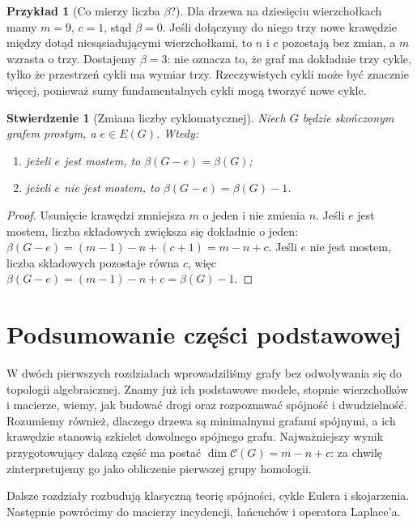 \documentclass[11pt,a4paper]{report}
\numberwithin{equation}{section}
\theoremstyle{plain}
\newtheorem{stwierdzenie}[twierdzenie]{Stwierdzenie}
\theoremstyle{definition}
\newtheorem{przyklad}[twierdzenie]{Przykład}
\theoremstyle{remark}
\begin{document}
\begin{przyklad}[Co mierzy liczba $\beta$?]
Dla drzewa na dziesięciu wierzchołkach mamy
$m=9$, $c=1$, stąd $\beta=0$.
Jeśli dołączymy do niego trzy nowe krawędzie
między dotąd niesąsiadującymi wierzchołkami,
to $n$ i $c$ pozostają bez zmian, a $m$
wzrasta o trzy. Dostajemy $\beta=3$:
nie oznacza to, że graf ma dokładnie trzy
cykle, tylko że przestrzeń cykli ma
wymiar trzy. Rzeczywistych cykli może
być znacznie więcej, ponieważ sumy
fundamentalnych cykli mogą tworzyć
nowe cykle.
\end{przyklad}

\begin{stwierdzenie}[Zmiana liczby cyklomatycznej]
Niech $G$ będzie skończonym grafem prostym,
a $e\in E(G)$. Wtedy:
\begin{enumerate}[label=(\roman*)]
\item jeżeli $e$ jest mostem, to $\beta(G-e)=\beta(G)$;
\item jeżeli $e$ nie jest mostem, to
$\beta(G-e)=\beta(G)-1$.
\end{enumerate}
\end{stwierdzenie}

\begin{proof}
Usunięcie krawędzi zmniejsza $m$ o jeden
i nie zmienia $n$. Jeśli $e$ jest mostem,
liczba składowych zwiększa się dokładnie
o jeden: $\beta(G-e)=(m-1)-n+(c+1)=m-n+c$.
Jeśli $e$ nie jest mostem, liczba
składowych pozostaje równa $c$, więc
$\beta(G-e)=(m-1)-n+c=\beta(G)-1$.
\end{proof}

\section*{Podsumowanie części podstawowej}

W dwóch pierwszych rozdziałach wprowadziliśmy grafy bez
odwoływania się do topologii algebraicznej. Znamy już ich
podstawowe modele, stopnie wierzchołków i macierze, wiemy,
jak budować drogi oraz rozpoznawać spójność i dwudzielność.
Rozumiemy również, dlaczego drzewa są minimalnymi grafami
spójnymi, a ich krawędzie stanowią szkielet dowolnego
spójnego grafu. Najważniejszy wynik przygotowujący dalszą
część ma postać $\dim\mathcal C(G)=m-n+c$: za chwilę
zinterpretujemy go jako obliczenie pierwszej grupy homologii.

Dalsze rozdziały rozbudują klasyczną teorię spójności,
cykle Eulera i skojarzenia. Następnie powrócimy do
macierzy incydencji, łańcuchów i operatora Laplace'a.
\end{document}
